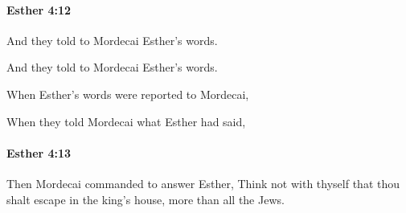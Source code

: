 		\paragraph{Esther 4:12} %
			\label{ESTHER-4-12}

			And they told to Mordecai Esther’s words.

			\begin{versebox}
					\item[BHS] 
					\item[LXX] 
					\item[ASV] And they told to Mordecai Esther's words.
					\item[NIV] When Esther’s words were reported to Mordecai,
					\item[NRSV] When they told Mordecai what Esther had said,
			\end{versebox}

		\paragraph{Esther 4:13} %
			\label{ESTHER-4-13}

			Then Mordecai commanded to answer Esther, Think not with thyself that thou shalt escape in the king’s house, more than all the Jews.


